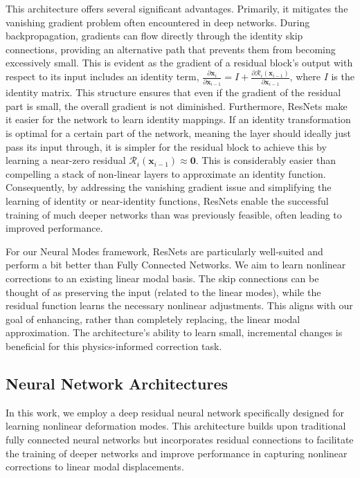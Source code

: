 This architecture offers several significant advantages. Primarily, it mitigates the vanishing gradient problem often encountered in deep networks. During backpropagation, gradients can flow directly through the identity skip connections, providing an alternative path that prevents them from becoming excessively small. This is evident as the gradient of a residual block's output with respect to its input includes an identity term, \( \frac{\partial \bm{x}_i}{\partial \bm{x}_{i-1}} = I + \frac{\partial \mathcal{R}_i(\bm{x}_{i-1})}{\partial \bm{x}_{i-1}} \), where \( I \) is the identity matrix. This structure ensures that even if the gradient of the residual part is small, the overall gradient is not diminished.
Furthermore, ResNets make it easier for the network to learn identity mappings. If an identity transformation is optimal for a certain part of the network, meaning the layer should ideally just pass its input through, it is simpler for the residual block to achieve this by learning a near-zero residual \( \mathcal{R}_i(\bm{x}_{i-1}) \approx \bm{0} \). This is considerably easier than compelling a stack of non-linear layers to approximate an identity function. Consequently, by addressing the vanishing gradient issue and simplifying the learning of identity or near-identity functions, ResNets enable the successful training of much deeper networks than was previously feasible, often leading to improved performance.

For our Neural Modes framework, ResNets are particularly well-suited and perform a bit better than Fully Connected Networks. We aim to learn nonlinear corrections to an existing linear modal basis. The skip connections can be thought of as preserving the input (related to the linear modes), while the residual function learns the necessary nonlinear adjustments. This aligns with our goal of enhancing, rather than completely replacing, the linear modal approximation. The architecture's ability to learn small, incremental changes is beneficial for this physics-informed correction task. 




\subsection{Neural Network Architectures}
In this work, we employ a deep residual neural network specifically designed for learning nonlinear deformation modes. This architecture builds upon traditional fully connected neural networks but incorporates residual connections to facilitate the training of deeper networks and improve performance in capturing nonlinear corrections to linear modal displacements.


